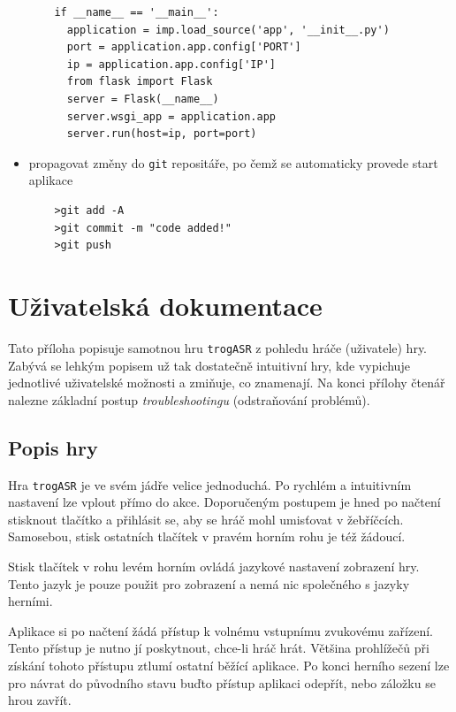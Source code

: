 \begin{itemize}
\begin{verbatim}
	if __name__ == '__main__':
	  application = imp.load_source('app', '__init__.py')
	  port = application.app.config['PORT']
	  ip = application.app.config['IP']
	  from flask import Flask
	  server = Flask(__name__)
	  server.wsgi_app = application.app
	  server.run(host=ip, port=port)
	\end{verbatim}
\newpage
\item propagovat změny do \verb|git| repositáře, po čemž se automaticky provede start aplikace
	\begin{verbatim}
	>git add -A
	>git commit -m "code added!"
	>git push
	\end{verbatim}
\end{itemize}

\chapter{Uživatelská dokumentace}
\label{appendix:user_doc}

Tato příloha popisuje samotnou hru \verb|trogASR| z pohledu hráče (uživatele) hry. Zabývá se lehkým popisem už tak dostatečně intuitivní hry, kde vypichuje jednotlivé uživatelské možnosti a zmiňuje, co znamenají. Na konci přílohy čtenář nalezne základní postup {\sl troubleshootingu} (odstraňování problémů).

\section{Popis hry}

Hra \verb|trogASR| je ve svém jádře velice jednoduchá. Po rychlém a intuitivním nastavení lze vplout přímo do akce. Doporučeným postupem je hned po načtení stisknout tlačítko  a přihlásit se, aby se hráč mohl umisťovat v žebříčcích. Samosebou, stisk ostatních tlačítek v pravém horním rohu je též žádoucí.

Stisk tlačítek v rohu levém horním ovládá jazykové nastavení zobrazení hry. Tento jazyk je pouze použit pro zobrazení a nemá nic společného s jazyky herními.

Aplikace si po načtení žádá přístup k volnému vstupnímu zvukovému zařízení. Tento přístup je nutno jí poskytnout, chce-li hráč hrát. Většina prohlížečů při získání tohoto přístupu ztlumí ostatní běžící aplikace. Po konci herního sezení lze pro návrat do původního stavu buďto přístup aplikaci odepřít, nebo záložku se hrou zavřít.

